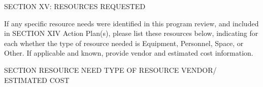 SECTION XV: RESOURCES REQUESTED


If any specific resource needs were identified in this program review, and included in SECTION XIV Action Plan(s), please list these resources below, indicating for each whether the type of resource needed is Equipment, Personnel, Space, or Other. If applicable and known, provide vendor and estimated cost information.

SECTION
RESOURCE NEED
TYPE OF RESOURCE
VENDOR/ ESTIMATED COST











































